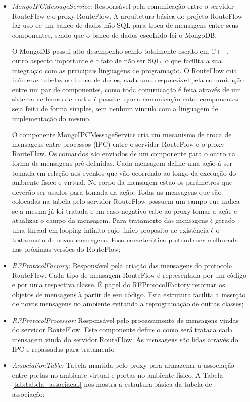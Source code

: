 \begin{itemize}
\item \textit{MongoIPCMessageService:} Responsável pela
 comunicação entre o servidor RouteFlow e o proxy 
RouteFlow. A arquitetura básica do projeto RouteFlow 
faz uso de um banco de dados não SQL para troca de 
mensagens entre seus componentes, sendo que o banco 
de dados escolhido foi o MongoDB. 

O MongoDB possui 
alto desempenho sendo totalmente escrito em C++, outro
 aspecto importante é o fato de não ser SQL, o 
que facilita a sua integração com as  principais linguagens
 de programação. 
O RouteFlow cria inúmeras tabelas no banco de dados, cada uma 
responsável pela comunicação entre um par 
de componentes, como toda comunicação é feita através de um 
sistema de banco de dados é possível que a 
comunicação entre componentes seja feita de forma simples, sem 
nenhum vinculo com a linguagem de 
implementação do mesmo. 

O componente MongoIPCMessageService 
cria um mecanismo de troca de mensagens entre processos (IPC) 
entre o servidor RouteFlow e o proxy RouteFlow. Os comandos são 
enviados de um componente para o outro 
na forma de mensagens pré-definidas. Cada mensagem define uma 
ação à ser tomada em relação aos eventos 
que vão ocorrendo ao longo da execução do ambiente físico e virtual. No corpo da 
mensagem estão os parâmetros que 
deverão ser usados para tomada da ação. Todas as mensagens que 
são colocadas na tabela pelo servidor RouteFlow 
possuem um campo que indica se a mesma já foi tratada e em caso 
negativo cabe ao proxy tomar a ação e 
atualizar o campo da mensagem. Para tratamento das mensagens é 
gerado uma thread em looping infinito 
cujo único proposito de existência é o tratamento de novas mensagens. 
Essa característica pretende ser melhorada nas próximas versões 
do RouteFlow;
\item \textit{RFProtocolFactory:} Responsável pela criação das 
mensagens do protocolo RouteFlow. Cada 
tipo de mensagem RouteFlow é representada por um código e 
por uma respectiva classe. É papel do 
RFProtocolFactory retornar os objetos de mensagens à partir de 
seu código. Esta estrutura facilita a 
inserção de novas mensagens no ambiente evitando a reprogramação 
de outras classes;
\item \textit{RFProtocolProcessor:} Responsável pelo processamento 
de mensagens vindas do servidor 
RouteFlow. Este componente define o como será tratada cada mensagem 
vinda do servidor RouteFlow. As 
mensagens são lidas através do IPC e repassadas para tratamento.
\item \textit{AssociationTable:} Tabela mantida pelo proxy para armazenar 
a associação entre portas no 
ambiente virtual e portas no ambiente físico. A Tabela \ref{tab:tabela_associacao} nos 
mostra a estrutura básica da tabela de associação:


\end{itemize}
